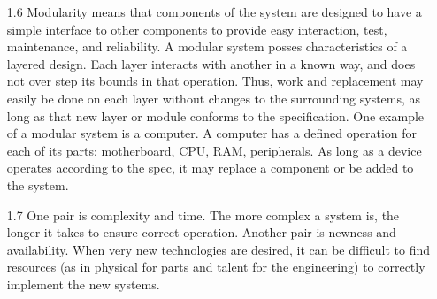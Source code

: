 \documentclass{article}
\begin{document}
\begin{itemize}
	\item[1.6]
		Modularity means that components of the system are designed to have a simple interface to other components to provide easy interaction, test, maintenance, and reliability. A modular system posses characteristics of a layered design. Each layer interacts with another in a known way, and does not over step its bounds in that operation. Thus, work and replacement may easily be done on each layer without changes to the surrounding systems, as long as that new layer or module conforms to the specification. One example of a modular system is a computer. A computer has a defined operation for each of its parts: motherboard, CPU, RAM, peripherals. As long as a device operates according to the spec, it may replace a component or be added to the system.

	\item[1.7]
		One pair is complexity and time. The more complex a system is, the longer it takes to ensure correct operation. Another pair is newness and availability. When very new technologies are desired, it can be difficult to find resources (as in physical for parts and talent for the engineering) to correctly implement the new systems.
\end{itemize}
\end{document}
